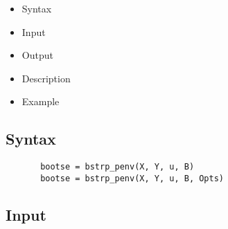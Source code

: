 \documentclass[a4paper,11pt,openany]{memoir}
\begin{document}
\begin{itemize}
\setlength{\itemsep}{-1ex}
   \item Syntax
   \item Input
   \item Output
   \item Description
   \item Example
\end{itemize}


\subsection*{Syntax}


\begin{verbatim}       bootse = bstrp_penv(X, Y, u, B)
       bootse = bstrp_penv(X, Y, u, B, Opts)\end{verbatim}
    

\subsection*{Input}
\end{document}
